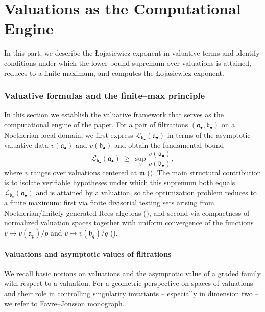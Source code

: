 \documentclass[12pt]{amsart}
\newcommand{\m}{\mathfrak m}
\renewcommand{\a}{\mathfrak{a}}
\renewcommand{\b}{\mathfrak{b}}
\newcommand{\Loj}{\mathcal{L}} %
\newcommand{\abul}{{\a_\bullet}}
\newcommand{\bbul}{{\b_\bullet}}
\theoremstyle{plain}
\theoremstyle{definition}
\numberwithin{equation}{section}
\begin{document}

\part{Valuations as the Computational Engine} \label{part:valuative}

In this part, we describe the \L{}ojasiewicz exponent in valuative terms and
identify conditions under which the lower bound supremum over valuations is
attained, reduces to a finite maximum, and computes the \L{}ojasiewicz exponent.

\section{Valuative formulas and the finite--max principle} \label{sec:valuative}

In this section we establish the valuative framework that serves as the computational engine of the paper.  For a pair of filtrations $(\abul,\bbul)$ on a Noetherian local domain, we first express $\Loj_{\bbul}(\abul)$ in terms of the asymptotic valuative data $v(\abul)$ and $v(\bbul)$ and obtain the fundamental bound
\[
\Loj_{\bbul}(\abul)\ \ge\ \sup_{v}\frac{v(\abul)}{v(\bbul)},
\]
where $v$ ranges over valuations centered at $\m$ ().  The main structural contribution is to isolate verifiable hypotheses under which this supremum both equals $\Loj_{\bbul}(\abul)$ and is attained by a valuation, so the optimization problem reduces to a finite maximum: first via finite divisorial testing sets arising from Noetherian/finitely generated Rees algebras (), and second via compactness of normalized valuation spaces together with uniform convergence of the functions $v\mapsto v(\a_p)/p$ and $v\mapsto v(\b_q)/q$ ().  


\subsection{Valuations and asymptotic values of filtrations}
We recall basic notions on valuations and the asymptotic value of a
graded family with respect to a valuation. For a geometric perspective on spaces of valuations and their role in controlling
singularity invariants -- especially in dimension two -- we refer to Favre--Jonsson \cite{FJ04} monograph.
\end{document}
